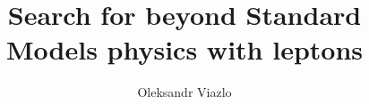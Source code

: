 \documentclass[hyperpdf,bindnopdf]{hepthesis}
\title{Search for beyond Standard Models physics with leptons}
\author{Oleksandr Viazlo}
\begin{document}


\begin{frontmatter}
  
\end{frontmatter}



\begin{mainmatter}
  
  
  
  
  
  
\end{mainmatter}

\begin{appendices}
  
\end{appendices}

\begin{backmatter}
  
\end{backmatter}

\end{document}
